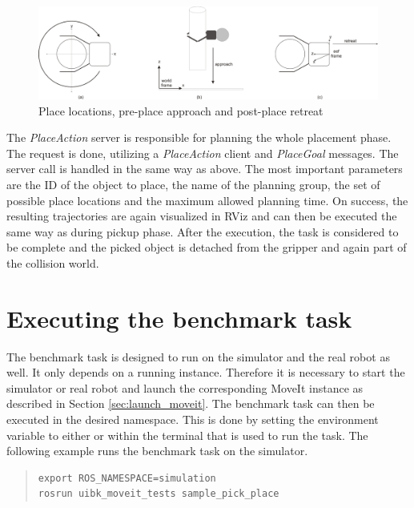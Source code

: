 \begin{figure}[ht]
	\centering
  	\includegraphics[width=1.0\textwidth]{images/place_a-c.jpg}
	\caption{Place locations, pre-place approach and post-place retreat}
	\label{fig:place_stages}
\end{figure}

The \emph{PlaceAction} server is responsible for planning the whole placement phase. The request is done, utilizing a \emph{PlaceAction} client and \emph{PlaceGoal} messages. The server call is handled in the same way as above. The most important parameters are the ID of the object to place, the name of the planning group, the set of possible place locations and the maximum allowed planning time.  On success, the resulting trajectories are again visualized in RViz and can then be executed the same way as during pickup phase. After the execution, the task is considered to be complete and the picked object is detached from the gripper and again part of the collision world.


\section{Executing the benchmark task}

The benchmark task is designed to run on the simulator and the real robot as well. It only depends on a running  instance. Therefore it is necessary to start the simulator or real robot and launch the corresponding MoveIt instance as described in Section \ref{sec:launch_moveit}. The benchmark task can then be executed in the desired namespace. This is done by setting the  environment variable to either  or  within the terminal that is used to run the task. The following example runs the benchmark task on the simulator.

\begin{quote}
\begin{verbatim}
export ROS_NAMESPACE=simulation
rosrun uibk_moveit_tests sample_pick_place 
\end{verbatim}
\end{quote}

